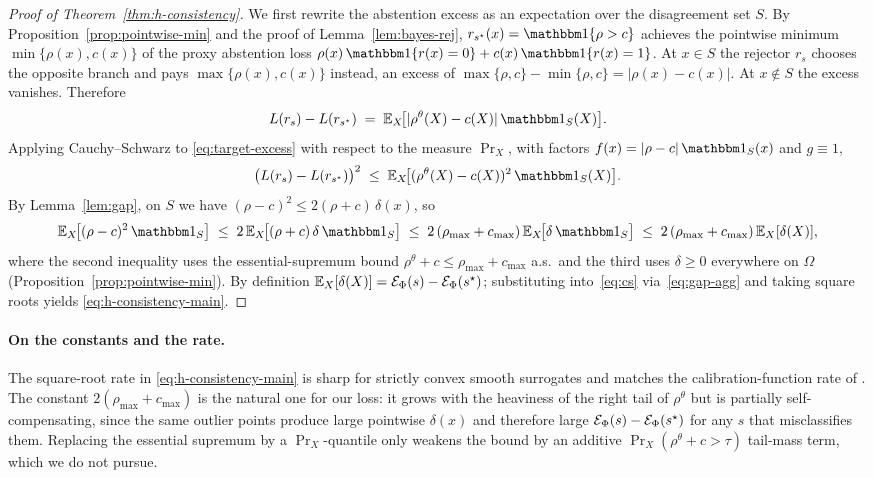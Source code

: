 \begin{proof}[Proof of Theorem~\ref{thm:h-consistency}]
We first rewrite the abstention excess as an expectation over the
disagreement set $S$. By Proposition~\ref{prop:pointwise-min} and the
proof of Lemma~\ref{lem:bayes-rej},
$r_{s^\star}(x)=\ind\{\rho>c\}$ achieves the pointwise minimum
$\min\{\rho(x),c(x)\}$ of the proxy abstention loss
$\rho(x)\,\ind\{r(x)=0\}+c(x)\,\ind\{r(x)=1\}$. At $x\in S$ the rejector
$r_s$ chooses the opposite branch and pays $\max\{\rho(x),c(x)\}$
instead, an excess of $\max\{\rho,c\}-\min\{\rho,c\}=|\rho(x)-c(x)|$.
At $x\notin S$ the excess vanishes. Therefore
\begin{equation}
  L(r_s)-L(r_{s^\star})\;=\;\E_X\!\bigl[|\rho^\theta(X)-c(X)|\,\ind_{S}(X)\bigr].
  \label{eq:target-excess}
\end{equation}
Applying Cauchy--Schwarz to \eqref{eq:target-excess} with respect to the
measure $\Pr_X$, with factors
$f(x)=|\rho-c|\,\ind_{S}(x)$ and $g\equiv 1$,
\begin{equation}
  \bigl(L(r_s)-L(r_{s^\star})\bigr)^2
  \;\leq\;\E_X\!\bigl[(\rho^\theta(X)-c(X))^2\,\ind_{S}(X)\bigr].
  \label{eq:cs}
\end{equation}
By Lemma~\ref{lem:gap}, on $S$ we have
$(\rho-c)^2\leq 2(\rho+c)\,\delta(x)$, so
\begin{equation}
  \E_X\!\bigl[(\rho-c)^2\,\ind_{S}\bigr]
  \;\leq\;2\,\E_X\!\bigl[(\rho+c)\,\delta\,\ind_{S}\bigr]
  \;\leq\;2\,(\rho_{\max}+c_{\max})\,\E_X\!\bigl[\delta\,\ind_{S}\bigr]
  \;\leq\;2\,(\rho_{\max}+c_{\max})\,\E_X[\delta(X)],
  \label{eq:gap-agg}
\end{equation}
where the second inequality uses the essential-supremum bound
$\rho^\theta+c\leq\rho_{\max}+c_{\max}$ a.s.\ and the third uses
$\delta\geq 0$ everywhere on $\Omega$ (Proposition~\ref{prop:pointwise-min}).
By definition $\mathbb{E}_X[\delta(X)]=\mathcal{E}_\Phi(s)-\mathcal{E}_\Phi(s^\star)$;
substituting into~\eqref{eq:cs} via~\eqref{eq:gap-agg} and taking square
roots yields \eqref{eq:h-consistency-main}.
\end{proof}

\paragraph{On the constants and the rate.}
The square-root rate in \eqref{eq:h-consistency-main} is sharp for
strictly convex smooth surrogates and matches the calibration-function
rate of \citet{bartlett2006convexity}. The constant
$2(\rho_{\max}+c_{\max})$ is the natural one for our loss: it grows with
the heaviness of the right tail of $\rho^\theta$ but is partially
self-compensating, since the same outlier points produce large pointwise
$\delta(x)$ and therefore large $\mathcal{E}_\Phi(s)-\mathcal{E}_\Phi(s^\star)$ for
any $s$ that misclassifies them. Replacing the essential supremum by a
$\Pr_X$-quantile only weakens the bound by an additive
$\Pr_X(\rho^\theta+c>\tau)$ tail-mass term, which we do not pursue.

